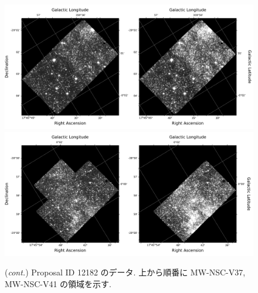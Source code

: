 \documentclass[10pt,a4paper,dvipdfmx,uplatex]{jsarticle}
\begin{document}
\addtocounter{figure}{-1}
\begin{figure}
  \centering
  \includegraphics[width=\linewidth]{img/hst_12182_a6_wfc3_ir_f127m_drz.pdf}
  \includegraphics[width=\linewidth]{img/hst_12182_a7_wfc3_ir_f127m_drz.pdf}
  \caption{(\textit{cont.}) Proposal ID 12182 のデータ. 上から順番に MW-NSC-V37, MW-NSC-V41 の領域を示す.}
  \label{fig:12182b}
\end{figure}
\end{document}
